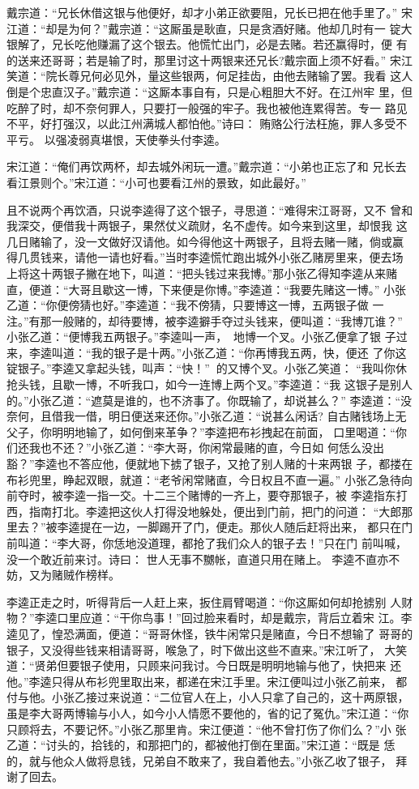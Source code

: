 戴宗道：“兄长休借这银与他便好，却才小弟正欲要阻，兄长已把在他手里了。”
宋江道：“却是为何？”戴宗道：“这厮虽是耿直，只是贪酒好赌。他却几时有一
锭大银解了，兄长吃他赚漏了这个银去。他慌忙出门，必是去赌。若还赢得时，便
有的送来还哥哥；若是输了时，那里讨这十两银来还兄长?戴宗面上须不好看。”
宋江笑道：“院长尊兄何必见外，量这些银两，何足挂齿，由他去赌输了罢。我看
这人倒是个忠直汉子。”戴宗道：“这厮本事自有，只是心粗胆大不好。在江州牢
里，但吃醉了时，却不奈何罪人，只要打一般强的牢子。我也被他连累得苦。专一
路见不平，好打强汉，以此江州满城人都怕他。”诗曰：
贿赂公行法枉施，罪人多受不平亏。
以强凌弱真堪恨，天使拳头付李逵。

宋江道：“俺们再饮两杯，却去城外闲玩一遭。”戴宗道：“小弟也正忘了和
兄长去看江景则个。”宋江道：“小可也要看江州的景致，如此最好。”

且不说两个再饮酒，只说李逵得了这个银子，寻思道：“难得宋江哥哥，又不
曾和我深交，便借我十两银子，果然仗义疏财，名不虚传。如今来到这里，却恨我
这几日赌输了，没一文做好汉请他。如今得他这十两银子，且将去赌一赌，倘或赢
得几贯钱来，请他一请也好看。”当时李逵慌忙跑出城外小张乙赌房里来，便去场
上将这十两银子撇在地下，叫道：“把头钱过来我博。”那小张乙得知李逵从来赌
直，便道：“大哥且歇这一博，下来便是你博。”李逵道：“我要先赌这一博。”
小张乙道：“你便傍猜也好。”李逵道：“我不傍猜，只要博这一博，五两银子做
一注。”有那一般赌的，却待要博，被李逵擗手夺过头钱来，便叫道：“我博兀谁？”
小张乙道：“便博我五两银子。”李逵叫一声，地博一个叉。小张乙便拿了银
子过来，李逵叫道：“我的银子是十两。”小张乙道：“你再博我五两，快，便还
了你这锭银子。”李逵又拿起头钱，叫声：“快！”的又博个叉。小张乙笑道：
“我叫你休抢头钱，且歇一博，不听我口，如今一连博上两个叉。”李逵道：“我
这银子是别人的。”小张乙道：“遮莫是谁的，也不济事了。你既输了，却说甚么？”
李逵道：“没奈何，且借我一借，明日便送来还你。”小张乙道：“说甚么闲话?
自古赌钱场上无父子，你明明地输了，如何倒来革争？”李逵把布衫拽起在前面，
口里喝道：“你们还我也不还？”小张乙道：“李大哥，你闲常最赌的直，今日如
何恁么没出豁？”李逵也不答应他，便就地下掳了银子，又抢了别人赌的十来两银
子，都搂在布衫兜里，睁起双眼，就道：“老爷闲常赌直，今日权且不直一遍。”
小张乙急待向前夺时，被李逵一指一交。十二三个赌博的一齐上，要夺那银子，被
李逵指东打西，指南打北。李逵把这伙人打得没地躲处，便出到门前，把门的问道：
“大郎那里去？”被李逵提在一边，一脚踢开了门，便走。那伙人随后赶将出来，
都只在门前叫道：“李大哥，你恁地没道理，都抢了我们众人的银子去！”只在门
前叫喊，没一个敢近前来讨。诗曰：
世人无事不嬲帐，直道只用在赌上。
李逵不直亦不妨，又为赌贼作榜样。

李逵正走之时，听得背后一人赶上来，扳住肩臂喝道：“你这厮如何却抢掳别
人财物？”李逵口里应道：“干你鸟事！”回过脸来看时，却是戴宗，背后立着宋
江。李逵见了，惶恐满面，便道：“哥哥休怪，铁牛闲常只是赌直，今日不想输了
哥哥的银子，又没得些钱来相请哥哥，喉急了，时下做出这些不直来。”宋江听了，
大笑道：“贤弟但要银子使用，只顾来问我讨。今日既是明明地输与他了，快把来
还他。”李逵只得从布衫兜里取出来，都递在宋江手里。宋江便叫过小张乙前来，
都付与他。小张乙接过来说道：“二位官人在上，小人只拿了自己的，这十两原银，
虽是李大哥两博输与小人，如今小人情愿不要他的，省的记了冤仇。”宋江道：“你
只顾将去，不要记怀。”小张乙那里肯。宋江便道：“他不曾打伤了你们么？”小
张乙道：“讨头的，拾钱的，和那把门的，都被他打倒在里面。”宋江道：“既是
恁的，就与他众人做将息钱，兄弟自不敢来了，我自着他去。”小张乙收了银子，
拜谢了回去。


